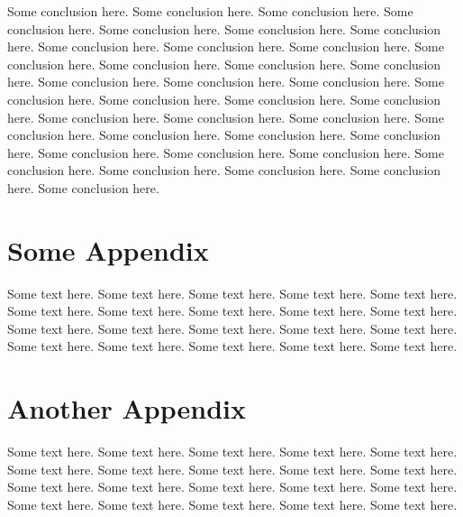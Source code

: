 \documentclass[11pt,twoside]{article}
\theoremstyle{plain}
\theoremstyle{definition}
\theoremstyle{remark}
\begin{document}
Some conclusion here. Some conclusion here. Some conclusion here. Some conclusion here.
Some conclusion here. Some conclusion here. Some conclusion here. Some conclusion here.
Some conclusion here. Some conclusion here. Some conclusion here. Some conclusion here.
Some conclusion here. Some conclusion here. Some conclusion here. Some conclusion here.
Some conclusion here. Some conclusion here. Some conclusion here. Some conclusion here.
Some conclusion here. Some conclusion here. Some conclusion here. Some conclusion here.
Some conclusion here. Some conclusion here. Some conclusion here. Some conclusion here.
Some conclusion here. Some conclusion here. Some conclusion here. Some conclusion here.
Some conclusion here. Some conclusion here. Some conclusion here. Some conclusion here.



\newpage

\printbibliography

\newpage

\appendix
\renewcommand{\thesection}{Appendix \Roman{section}}
\renewcommand{\thesubsection}{Appendix \Roman{section}(\roman{subsection})}

\section{Some Appendix} %
\label{sec:some_appendix}

Some text here. Some text here. Some text here. Some text here.
Some text here. Some text here. Some text here. Some text here.
Some text here. Some text here. Some text here. Some text here.
Some text here. Some text here. Some text here. Some text here.
Some text here. Some text here. Some text here. Some text here.


\section{Another Appendix} %
\label{sec:another_appendix}

Some text here. Some text here. Some text here. Some text here.
Some text here. Some text here. Some text here. Some text here.
Some text here. Some text here. Some text here. Some text here.
Some text here. Some text here. Some text here. Some text here.
Some text here. Some text here. Some text here. Some text here.

\end{document}

